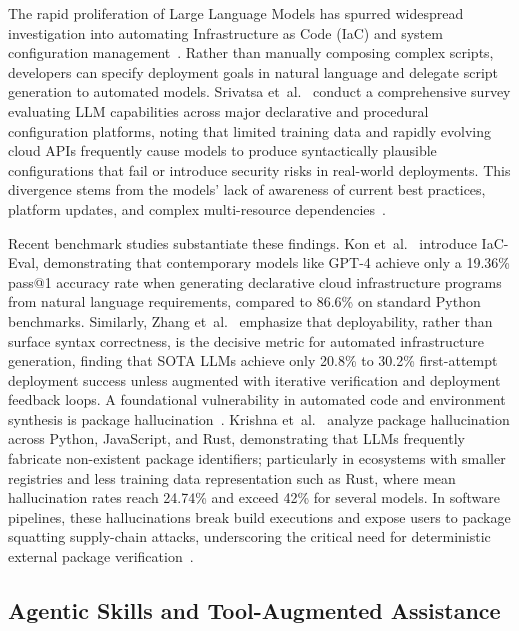 The rapid proliferation of Large Language Models has spurred widespread investigation
into automating Infrastructure as Code (IaC) and system configuration management~\cite{kateGenerativeAIInfrastructure}.
Rather than manually composing complex scripts, developers can specify deployment
goals in natural language and delegate script generation to automated models.
Srivatsa et~al.~\cite{srivatsaSurveyUsingLarge} conduct a comprehensive survey evaluating
LLM capabilities across major declarative and procedural configuration platforms,
noting that limited training data and rapidly evolving cloud APIs frequently
cause models to produce syntactically plausible configurations that fail or
introduce security risks in real-world deployments. This divergence stems from the
models' lack of awareness of current best practices, platform updates, and
complex multi-resource dependencies~\cite{srivatsaSurveyUsingLarge}.

Recent benchmark studies substantiate these findings. Kon et~al.~\cite{konIaCEvalCodeGeneration}
introduce IaC-Eval, demonstrating that contemporary models like GPT-4 achieve only
a 19.36\% pass@1 accuracy rate when generating declarative cloud infrastructure
programs from natural language requirements, compared to 86.6\% on standard
Python benchmarks. Similarly, Zhang et~al.~\cite{zhangDeployabilityCentricInfrastructureasCodeGeneration2025}
emphasize that deployability, rather than surface syntax correctness, is the decisive
metric for automated infrastructure generation, finding that SOTA LLMs achieve
only 20.8\% to 30.2\% first-attempt deployment success unless augmented with
iterative verification and deployment feedback loops. A foundational vulnerability
in automated code and environment synthesis is package hallucination~\cite{ImportingPhantomsMeasuring}.
Krishna et~al.~\cite{ImportingPhantomsMeasuring} analyze package hallucination across
Python, JavaScript, and Rust, demonstrating that LLMs frequently fabricate non-existent
package identifiers; particularly in ecosystems with smaller registries and less training
data representation such as Rust, where mean hallucination rates reach 24.74\% and
exceed 42\% for several models. In software pipelines, these hallucinations
break build executions and expose users to package squatting supply-chain
attacks, underscoring the critical need for deterministic external package verification~\cite{ImportingPhantomsMeasuring}.

\subsection{Agentic Skills and Tool-Augmented Assistance}

